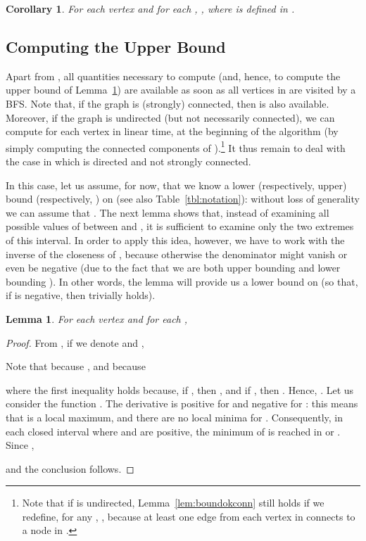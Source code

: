 \documentclass{acm_proc_article-sp}
\newtheorem{lemma}{Lemma}
\newtheorem{corollary}{Corollary}
\begin{document}
\begin{corollary}\label{cor:ubound}
For each vertex  and for each , , where  is defined in .
\end{corollary}

\subsection{Computing the Upper Bound}\label{sec:ubound}

Apart from , all quantities necessary to compute  (and, hence, to compute the upper bound of Lemma~\ref{cor:ubound}) are available as soon as all vertices in  are visited by a BFS. Note that, if the graph  is (strongly) connected, then  is also available. Moreover, if the graph  is undirected (but not necessarily connected), we can compute  for each vertex  in linear time, at the beginning of the algorithm (by simply computing the connected components of ).\footnote{Note that if  is undirected, Lemma~\ref{lem:boundokconn} still holds if we redefine, for any , , because at least one edge from each vertex  in  connects  to a node in .
} It thus remain to deal with the case in which  is directed and not strongly connected.

In this case, let us assume, for now, that we know a lower (respectively, upper) bound  (respectively, ) on  (see also Table~\ref{tbl:notation}): without loss of generality we can assume that . The next lemma shows that, instead of examining all possible values of  between  and , it is sufficient to examine only the two extremes of this interval. In order to apply this idea, however, we have to work with the inverse  of the closeness of , because otherwise the denominator might vanish or even be negative (due to the fact that we are both upper bounding  and lower bounding ). In other words, the lemma will provide us a lower bound  on  (so that, if  is negative, then  trivially holds).

\begin{lemma}\label{lem:lowbound}
For each vertex  and for each ,
\end{lemma}
\begin{proof}
From , if we denote  and ,

Note that  because , and  because

where the first inequality holds because, if , then , and if , then . 
Hence, . Let us consider the function . The derivative  is positive for  and negative for : this means that  is a local maximum, and there are no local minima for . Consequently, in each closed interval  where  and  are positive, the minimum of  is reached in  or . Since , 

and the conclusion follows.
\end{proof}
\end{document}
